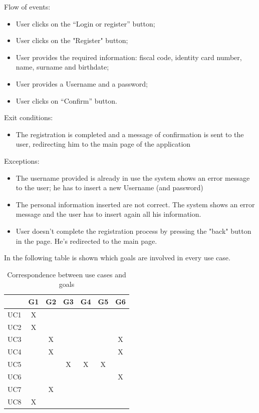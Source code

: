 \documentclass[a4paper]{report}
\begin{document}
Flow of events:
\begin{itemize}
\item User clicks on the “Login or register” button;
\item User clicks on the "Register" button;
\item User provides the required information: fiscal code, identity card number, name, surname and birthdate;
\item User provides a Username and a password;
\item User clicks on “Confirm” button.
\end{itemize}
Exit conditions: 
\begin{itemize}
\item The registration is completed and a message of confirmation is sent to the user, redirecting him to the main page of the application
\end{itemize} 
Exceptions: 
\begin{itemize}
\item The username provided is already in use the system shows an error message to the user; he has to insert a new Username (and password)
\item The personal information inserted are not correct. The system shows an error message and the user has to insert again all his information.
\item User doesn't complete the registration process by pressing the "back" button in the page. He's redirected to the main page.
\end{itemize}

In the following table is shown which goals are involved in every use case.
\begin{table}[H]  
  \centering
  \begin{tabular}{|c|c|c|c|c|c|c|}
    \cline{2-7}
    \multicolumn{1}{c|}{} & G1 & G2 & G3 & G4 & G5 & G6 \\ \hline
    UC1 & X &   &   &   &   &   \\ \hline
    UC2 & X &   &   &   &   &   \\ \hline
    UC3 &   & X &   &   &   & X \\ \hline
    UC4 &   & X &   &   &   & X \\ \hline
    UC5 &   &   & X & X & X &   \\ \hline
    UC6 &   &   &   &   &   & X \\ \hline
    UC7 &   & X &   &   &   &   \\ \hline
    UC8 & X &   &   &   &   &   \\ \hline
  \end{tabular}
  \caption{Correspondence between use cases and goals}
\end{table}
\end{document}
